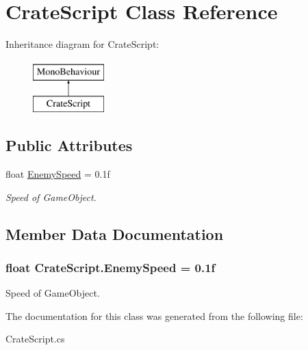 \hypertarget{classCrateScript}{\section{Crate\-Script Class Reference}
\label{classCrateScript}
}
Inheritance diagram for Crate\-Script\-:\begin{figure}[H]
\begin{center}
\leavevmode
\includegraphics[height=2.000000cm]{classCrateScript}
\end{center}
\end{figure}
\subsection*{Public Attributes}
\begin{DoxyCompactItemize}
\item 
float \hyperlink{classCrateScript_a60ff5faecd26f04a37351e1de67019b5}{Enemy\-Speed} = 0.\-1f
\begin{DoxyCompactList}\small\item\em Speed of Game\-Object. \end{DoxyCompactList}\end{DoxyCompactItemize}


\subsection{Member Data Documentation}
\hypertarget{classCrateScript_a60ff5faecd26f04a37351e1de67019b5}{
\subsubsection[{Enemy\-Speed}]{\setlength{\rightskip}{0pt plus 5cm}float Crate\-Script.\-Enemy\-Speed = 0.\-1f}}\label{classCrateScript_a60ff5faecd26f04a37351e1de67019b5}


Speed of Game\-Object. 



The documentation for this class was generated from the following file\-:\begin{DoxyCompactItemize}
\item 
Crate\-Script.\-cs\end{DoxyCompactItemize}

